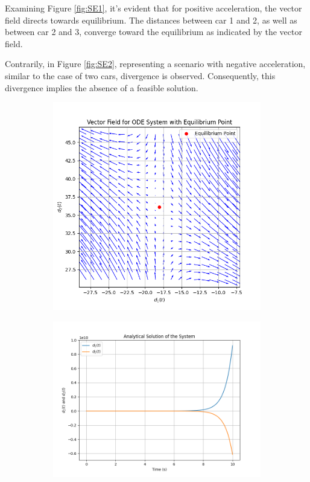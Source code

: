 \documentclass{article}
\begin{document}
		Examining Figure \ref{fig:SE1}, it's evident that for positive acceleration, the vector field directs towards equilibrium. The distances between car 1 and 2, as well as between car 2 and 3, converge toward the equilibrium as indicated by the vector field.
		
		Contrarily, in Figure \ref{fig:SE2}, representing a scenario with negative acceleration, similar to the case of two cars, divergence is observed. Consequently, this divergence implies the absence of a feasible solution.
		
		\begin{figure}[H]
			\centering
			\begin{subfigure}{0.43\textwidth}
				\centering
				\includegraphics[width=\linewidth]{FieldOfVector_DV2.png}
			\end{subfigure}
			\hfill
			\begin{subfigure}{0.51\textwidth}
				\centering
				\includegraphics[width=\linewidth]{AnalyticalSolution2.png}

\end{subfigure}
\end{figure}
\end{document}
